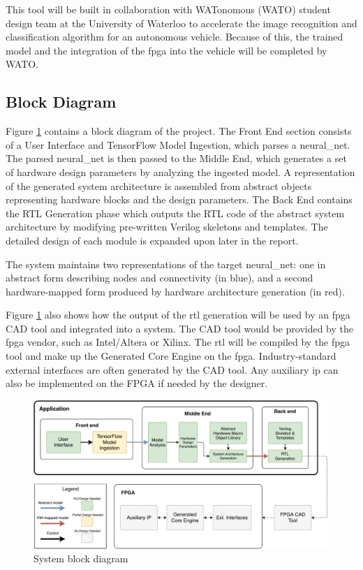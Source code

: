 \documentclass{uw-ece-wkrpt}
\begin{document}
This tool will be built in collaboration with WATonomous (WATO) student design team at the University of Waterloo to accelerate the image recognition and classification algorithm for an autonomous vehicle. Because of this, the trained model and the integration of the \gls{fpga} into the vehicle will be completed by WATO.

\subsection{Block Diagram}

Figure \ref{fig:system_block_diagram} contains a block diagram of the project. The Front End section consists of a User Interface and TensorFlow Model Ingestion, which parses a \gls{neural_net}. The parsed \gls{neural_net} is then passed to the Middle End, which generates a set of hardware design parameters by analyzing the ingested model. A representation of the generated system architecture is assembled from abstract objects representing hardware blocks and the design parameters. The Back End contains the RTL Generation phase which outputs the RTL code of the abstract system architecture by modifying pre-written Verilog skeletons and templates. The detailed design of each module is expanded upon later in the report.

The system maintains two representations of the target \gls{neural_net}: one in abstract form describing nodes and connectivity (in blue), and a second hardware-mapped form produced by hardware architecture generation (in red).

Figure \ref{fig:system_block_diagram} also shows how the output of the \gls{rtl} generation will be used by an \gls{fpga} CAD tool and integrated into a system. The CAD tool would be provided by the \gls{fpga} vendor, such as Intel/Altera or Xilinx. The \gls{rtl} will be compiled by the \gls{fpga} tool and make up the Generated Core Engine on the \gls{fpga}. Industry-standard external interfaces are often generated by the CAD tool. Any auxiliary \gls{ip} can also be implemented on the FPGA if needed by the designer.

\begin{figure}
    \centering
    \includegraphics[width=\textwidth]{figures/system_block_diagram}
    \caption{System block diagram}\label{fig:system_block_diagram}
\end{figure}
\end{document}
